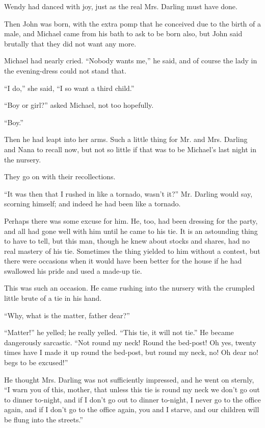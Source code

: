 Wendy had danced with joy, just as the real Mrs. Darling must have done.

Then John was born, with the extra pomp that he conceived due to the birth of a
male, and Michael came from his bath to ask to be born also, but John said
brutally that they did not want any more.

Michael had nearly cried.
``Nobody wants me,'' he said, and of course the lady in the evening-dress could
not stand that.

``I do,'' she said, ``I so want a third child.''

``Boy or girl?'' asked Michael, not too hopefully.

``Boy.''

Then he had leapt into her arms.
Such a little thing for Mr. and Mrs. Darling and Nana to recall now, but not so
little if that was to be Michael's last night in the nursery.

They go on with their recollections.

``It was then that I rushed in like a tornado, wasn't it?'' Mr. Darling would
say, scorning himself; and indeed he had been like a tornado.

Perhaps there was some excuse for him. He, too, had been dressing for the party,
and all had gone well with him until he came to his tie.
It is an astounding thing to have to tell, but this man, though he knew about
stocks and shares, had no real mastery of his tie.
Sometimes the thing yielded to him without a contest, but there were occasions
when it would have been better for the house if he had swallowed his pride and
used a made-up tie.

This was such an occasion.
He came rushing into the nursery with the crumpled little brute of a tie in his
hand.

``Why, what is the matter, father dear?''

``Matter!'' he yelled; he really yelled.
``This tie, it will not tie.''
He became dangerously sarcastic.
``Not round my neck! Round the bed-post!
Oh yes, twenty times have I made it up round the bed-post, but round my neck,
no!
Oh dear no! begs to be excused!''

He thought Mrs. Darling was not sufficiently impressed, and he went on sternly,
``I warn you of this, mother, that unless this tie is round my neck we don't go
out to dinner to-night, and if I don't go out to dinner to-night, I never go to
the office again, and if I don't go to the office again, you and I starve, and
our children will be flung into the streets.''


